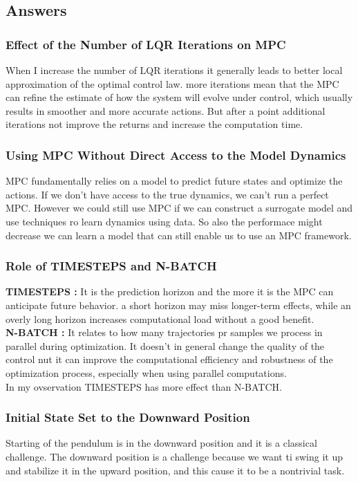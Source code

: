 \subsection{Answers}
\subsubsection{Effect of the Number of LQR Iterations on MPC}
When I increase the number of LQR iterations it generally leads to better local approximation of the optimal control law. more iterations mean that the MPC can refine the estimate of how the system will evolve under control, which usually results in smoother and more accurate actions. But after a point additional iterations not improve the returns and increase the computation time.

\subsubsection{Using MPC Without Direct Access to the Model Dynamics}
MPC fundamentally relies on a model to predict future states and optimize the actions. If we don't have access to the true dynamics, we can't run a perfect MPC. However we could still use MPC if we can construct a surrogate model and use techniques ro learn dynamics using data. So also the performace might decrease we can learn a model that can still enable us to use an MPC framework.

\subsubsection{Role of TIMESTEPS and N-BATCH}
\textbf{TIMESTEPS : } It is the prediction horizon and the more it is the MPC can anticipate future behavior. a short horizon may miss longer-term effects, while an overly long horizon increases computational load without a good benefit. \\
\textbf{N-BATCH :} It relates to how many trajectories pr samples we process in parallel during optimization. It doesn't in general change the quality of the control nut it can improve the computational efficiency and robustness of the optimization process, especially when using parallel computations.\\
In my ovservation TIMESTEPS has more effect than N-BATCH.

\subsubsection{Initial State Set to the Downward Position}
Starting of the pendulum is in the downward position and it is a classical challenge. The downward position is a challenge because we want ti swing it up and stabilize it in the upward position, and this cause it to be a nontrivial task.

